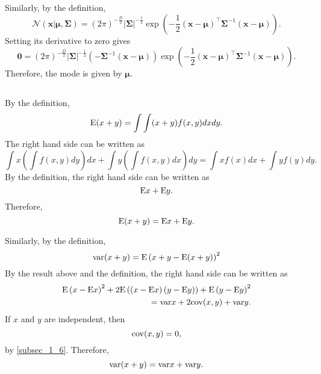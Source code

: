 Similarly, by the definition,
%
\begin{equation}
\mathcal{N} \left( \mathbf{x} | \bm{\mu}, \bm{\Sigma} \right) = \left( 2 \pi \right) ^ {- \frac{D}{2}} |\bm{\Sigma}| ^ {- \frac{1}{2}} \exp \left( - \frac{1}{2} (\mathbf{x} - \bm{\mu}) ^ \intercal \bm{\Sigma} ^ {- 1} (\mathbf{x} - \bm{\mu}) \right).
\end{equation}
%
Setting its derivative to zero gives
%
\begin{equation}
\mathbf{0} = \left( 2 \pi \right) ^ {- \frac{D}{2}} |\bm{\Sigma}| ^ {- \frac{1}{2}} \left( - \bm{\Sigma} ^ {- 1} (\mathbf{x} - \bm{\mu}) \right) \exp \left( - \frac{1}{2} (\mathbf{x} - \bm{\mu}) ^ \intercal \bm{\Sigma} ^ {- 1} (\mathbf{x} - \bm{\mu}) \right).
\end{equation}
%
Therefore, the mode is given by $\bm{\mu}$.


\subsection{}
By the definition,
%
\begin{equation}
{\rm E} (x + y) = \int \int (x + y) f(x, y) dx dy.
\end{equation}
%
The right hand side can be written as 
%
\begin{equation}
\int x \left( \int f(x, y) dy \right) dx + \int y \left( \int f(x, y) dx \right) dy = \int x f(x) dx + \int y f(y) dy.
\end{equation}
%
By the definition, the right hand side can be written as 
%
\begin{equation}
{\rm E} x + {\rm E} y.
\end{equation}
%
Therefore, 
%
\begin{equation}
{\rm E} (x + y) = {\rm E} x + {\rm E} y.
\end{equation}
%

Similarly, by the definition,
%
\begin{equation}
{\rm var} (x + y) = {\rm E} \left( x + y - {\rm E} (x + y) \right) ^ 2
\end{equation}
%
By the result above and the definition, the right hand side can be written as 
%
\begin{equation}
\begin{aligned}
{\rm E} \left( x - {\rm E} x \right) ^ 2 + 2 {\rm E} \left( \left( x - {\rm E} x \right) \left( y - {\rm E} y \right) \right) + {\rm E} \left( y - {\rm E} y \right) ^ 2 \\
= {\rm var} x + 2 {\rm cov} (x, y) + {\rm var} y.
\end{aligned}
\end{equation}
%
If $x$ and $y$ are independent, then 
%
\begin{equation}
{\rm cov} (x, y) = 0,
\end{equation}
%
by \ref{subsec_1_6}. Therefore,
%
\begin{equation}
{\rm var} (x + y) = {\rm var} x + {\rm var} y.
\end{equation}
%

